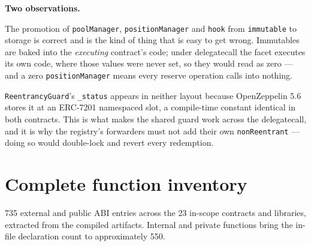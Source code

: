 \documentclass[11pt,a4paper]{article}
\newcommand{\code}[1]{\texttt{\small #1}}
\begin{document}
\noindent\textbf{Two observations.}

The promotion of \code{poolManager}, \code{positionManager} and \code{hook} from
\code{immutable} to storage is correct and is the kind of thing that is easy to get
wrong. Immutables are baked into the \emph{executing} contract's code; under
delegatecall the facet executes its own code, where those values were never set, so
they would read as zero --- and a zero \code{positionManager} means every reserve
operation calls into nothing.

\code{ReentrancyGuard}'s \code{\_status} appears in neither layout because
OpenZeppelin 5.6 stores it at an ERC-7201 namespaced slot, a compile-time constant
identical in both contracts. This is what makes the shared guard work across the
delegatecall, and it is why the registry's forwarders must not add their own
\code{nonReentrant} --- doing so would double-lock and revert every redemption.

\section{Complete function inventory}
\label{sec:inventory}

735 external and public ABI entries across the 23 in-scope contracts and
libraries, extracted from the compiled artifacts. Internal and private functions
bring the in-file declaration count to approximately 550.


\end{document}
